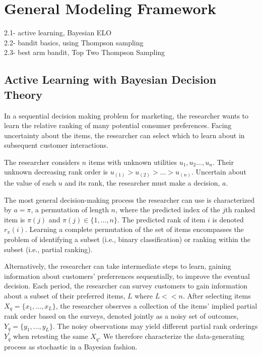 \documentclass[nonblindrev]{informs3}
\newcommand{\numitems}{n}
\newcommand{\numperset}{L}
\begin{document}
\section{General Modeling Framework}


2.1- active learning, Bayesian ELO \\
2.2- bandit basics, using Thompson sampling\\
2.3- best arm bandit, Top Two Thompson Sampling\\

\subsection{Active Learning with Bayesian Decision Theory}

In a sequential decision making problem for marketing, the researcher wants to learn the relative ranking of many potential consumer preferences. Facing uncertainty about the items, the researcher can select which to learn about in subsequent customer interactions.

The researcher considers $\numitems$ items with unknown utilities $u_1,u_2 \ldots, u_\numitems$. Their unknown decreasing rank order is $u_{(1)} > u_{(2)} > \ldots > u_{(\numitems)}$. Uncertain about the value of each $u$ and its rank, the researcher must make a decision, $a$. 

The most general decision-making process the researcher can use is characterized by $a=\pi$, a permutation of length $\numitems$, where the predicted index of the $j$th ranked item is $\pi(j)$ and $\pi(j) \in \{1,\ldots,\numitems\}$. The predicted rank of item $i$ is denoted $r_\pi(i)$. Learning a complete permutation of the set of items encompasses the problem of identifying a subset (i.e., binary classification) or ranking within the subset (i.e., partial ranking). 

Alternatively, the researcher can take intermediate steps to learn, gaining information about customers' preferrences sequentially, to improve the eventual decision. Each period, the researcher can survey customers to gain information about a subset of their preferred items, $\numperset$ where $\numperset << \numitems$. After selecting items $X_q = \{ x_1,\ldots, x_\numperset \}$, the researcher observes a collection of the items' implied partial rank order based on the surveys, denoted jointly as a noisy set of outcomes, $Y_q = \{ y_1,\ldots, y_\numperset \}$. The noisy observations may yield different partial rank orderings $Y_q^{'}$ when retesting the same $X_q$. We therefore characterize the data-generating process as stochastic in a Bayesian fashion. 
\end{document}
